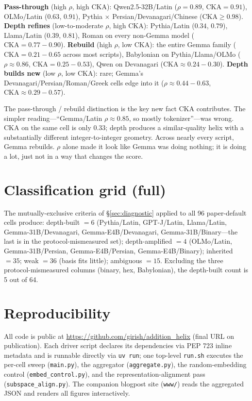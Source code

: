 \documentclass[10pt,letterpaper]{article}
\begin{document}
\textbf{Pass-through} (high $\rho$, high CKA): Qwen2.5-32B/Latin
($\rho=0.89$, $\text{CKA}=0.91$), OLMo/Latin ($0.63$, $0.91$),
Pythia $\times$ Persian/Devanagari/Chinese ($\text{CKA} \ge 0.98$).
\textbf{Depth refines} (low-to-moderate $\rho$, high CKA):
Pythia/Latin ($0.34$, $0.79$), Llama/Latin ($0.39$, $0.81$), Roman on
every non-Gemma model ($\text{CKA} = 0.77{-}0.90$).
\textbf{Rebuild} (high $\rho$, low CKA): the entire Gemma family
($\text{CKA} = 0.21{-}0.65$ across most scripts), Babylonian on
Pythia/Llama/OLMo ($\rho \approx 0.86$, $\text{CKA} = 0.25{-}0.53$),
Qwen on Devanagari ($\text{CKA} \approx 0.24{-}0.30$).
\textbf{Depth builds new} (low $\rho$, low CKA): rare; Gemma's
Devanagari/Persian/Roman/Greek cells edge into it
($\rho \approx 0.44{-}0.63$, $\text{CKA} \approx 0.29{-}0.57$).

The pass-through / rebuild distinction is the key new fact CKA
contributes. The simpler reading---``Gemma/Latin $\rho \approx 0.85$,
so mostly tokenizer''---was wrong. CKA on the same cell is only
$0.33$; depth produces a similar-quality helix with a substantially
different integer-to-integer geometry. Across nearly every script,
Gemma rebuilds. $\rho$ alone made it look like Gemma was doing
nothing; it is doing a lot, just not in a way that changes the score.

\section{Classification grid (full)}
\label{app:classification}

The mutually-exclusive criteria of \S\ref{sec:diagnostic} applied to
all 96 paper-default cells produce: depth-built $= 6$ (Pythia/Latin,
GPT-J/Latin, Llama/Latin, Gemma-31B/Devanagari, Gemma-E4B/Devanagari,
Gemma-31B/Binary---the last is in the protocol-mismeasured set);
depth-amplified $= 4$ (OLMo/Latin, Gemma-31B/Persian,
Gemma-E4B/Persian, Gemma-E4B/Binary); inherited $= 35$; weak
$= 36$ (basis fits little); ambiguous $= 15$. Excluding the
three protocol-mismeasured columns (binary, hex, Babylonian),
the depth-built count is 5 out of 64.

\section{Reproducibility}
\label{app:repro}

All code is public at
\url{https://github.com/girish/addition_helix} (final URL on
publication). Each driver script declares its dependencies via PEP 723
inline metadata and is runnable directly via \texttt{uv run}; one
top-level \texttt{run.sh} executes the per-cell sweep
(\texttt{main.py}), the aggregator (\texttt{aggregate.py}), the
random-embedding control (\texttt{embed\_control.py}), and the
representation-alignment pass (\texttt{subspace\_align.py}). The
companion blogpost site (\texttt{www/}) reads the aggregated JSON
and renders all figures interactively.
\end{document}
